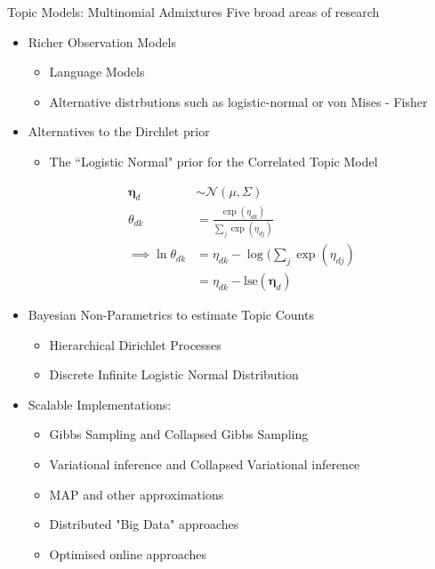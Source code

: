 \documentclass[xcolor=dvipsnames]{beamer}
\newcommand \vv[1] { \boldsymbol #1 }
\newcommand \nor[2]   { \mathcal{N} \left( {#1}, {#2} \right) }
\newcommand \lse { \text{lse} }
\begin{document}

\begin{frame}{Topic Models: Multinomial Admixtures}
Five broad areas of research
\begin{itemize}
    \item<1-> Richer Observation Models
         { \begin{itemize}
        \item Language Models\cite{Wallach2006}\cite{Wang2007}\cite{Lindsey2012} 
        \item Alternative distrbutions such as logistic-normal\cite{Blei2006a}\cite{Eisenstein2010} or von Mises - Fisher\cite{Reisinger2010}
    \end{itemize} }
    
    \item<2-> Alternatives to the Dirchlet prior
     { 
        \begin{itemize}
            \item The ``Logistic Normal" prior for the Correlated Topic Model\cite{Blei2006}
        \end{itemize}

        \begin{align}
        \vv{\eta}_d & \sim \nor{\mu}{\Sigma} \\
        \theta_{dk} & = \frac{\exp(\eta_{dk})}{\sum_j \exp(\eta_{dj})} \\
        \implies \ln \theta_{dk} & = \eta_{dk} - \log(\sum_j \exp(\eta_{dj}) \\
         & = \eta_{dk} - \lse(\vv{\eta}_d)
    \end{align} 
    }

    \item<3-> Bayesian Non-Parametrics to estimate Topic Counts
     { \begin{itemize}
         \item Hierarchical Dirichlet Processes\cite{Teh2006b}
         \item Discrete Infinite Logistic Normal Distribution\cite{Paisley2012}
    \end{itemize} }

    \item<4-> Scalable Implementations: 
     { \begin{itemize}
        \item Gibbs Sampling\cite{Pritchard2000} and Collapsed Gibbs Sampling\cite{Griffiths2004} 
        \item Variational\cite{BleiNgJordan2003} inference and Collapsed Variational\cite{Teh2007}\cite{Hensman2012} inference
        \item MAP and other approximations\cite{Asuncion2012}
        \item Distributed "Big Data" approaches\cite{Smola2010}\cite{Newman2009}\cite{Chen2013}
        \item Optimised online approaches\cite{Hoffman2010}\cite{Hoffman2012}\cite{Mimno2012a}
    \end{itemize} }
    

\end{itemize}
\end{frame}
\end{document}
